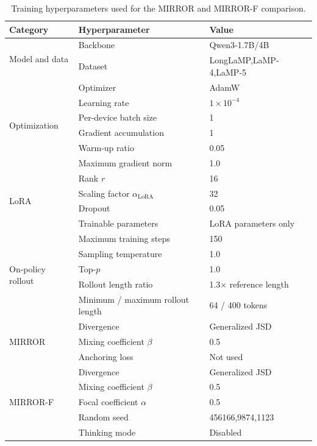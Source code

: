 \documentclass{article} %
\begin{document}
\begin{table}[t]
\centering
\small
\caption{Training hyperparameters used for the MIRROR and MIRROR-F comparison.}
\label{tab:training_hyperparameters}
\begin{tabular}{lll}
\toprule
\textbf{Category} & \textbf{Hyperparameter} & \textbf{Value} \\
\midrule
\multirow{2}{*}{Model and data}
& Backbone & Qwen3-1.7B/4B \\
& Dataset & LongLaMP,LaMP-4,LaMP-5 \\
\midrule
\multirow{6}{*}{Optimization}
& Optimizer & AdamW \\
& Learning rate & $1\times 10^{-4}$ \\
& Per-device batch size & 1 \\
& Gradient accumulation & 1 \\
& Warm-up ratio & 0.05 \\
& Maximum gradient norm & 1.0 \\
\midrule
\multirow{4}{*}{LoRA}
& Rank $r$ & 16 \\
& Scaling factor $\alpha_{\mathrm{LoRA}}$ & 32 \\
& Dropout & 0.05 \\
& Trainable parameters & LoRA parameters only \\
\midrule
\multirow{5}{*}{On-policy rollout}
& Maximum training steps & 150 \\
& Sampling temperature & 1.0 \\
& Top-$p$ & 1.0 \\
& Rollout length ratio & 1.3$\times$ reference length \\
& Minimum / maximum rollout length & 64 / 400 tokens \\
\midrule
\multirow{3}{*}{MIRROR}
& Divergence & Generalized JSD \\
& Mixing coefficient $\beta$ & 0.5 \\
& Anchoring loss & Not used \\
\midrule
\multirow{5}{*}{MIRROR-F}
& Divergence & Generalized JSD \\
& Mixing coefficient $\beta$ & 0.5 \\
& Focal coefficient $\alpha$ & 0.5 \\
\midrule
\multirow{2}{*}{Reproducibility}
& Random seed & 456166,9874,1123 \\
& Thinking mode & Disabled \\
\bottomrule
\end{tabular}
\end{table}
\end{document}
